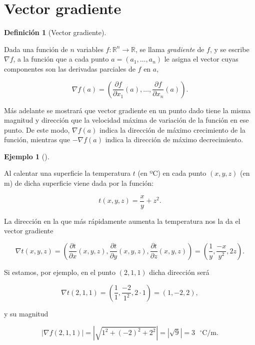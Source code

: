 \documentclass[
  a4paper,
]{scrreport}
\theoremstyle{definition}
\newtheorem{definition}{Definición}[chapter]
\theoremstyle{plain}
\theoremstyle{plain}
\theoremstyle{definition}
\theoremstyle{definition}
\newtheorem{example}{Ejemplo}[chapter]
\theoremstyle{plain}
\theoremstyle{remark}
\begin{document}
\hypertarget{vector-gradiente}{%
\section{Vector gradiente}\label{vector-gradiente}}

\begin{definition}[Vector
gradiente]\protect\hypertarget{def-vector-gradiente}{}\label{def-vector-gradiente}

Dada una función de \(n\) variables
\(f:\mathbb{R}^n\rightarrow \mathbb{R}\), se llama \emph{gradiente} de
\(f\), y se escribe \(\nabla f\), a la función que a cada punto
\(a=(a_1,\ldots,a_n)\) le asigna el vector cuyas componentes son las
derivadas parciales de \(f\) en \(a\),

\[\nabla f(a)=\left(\frac{\partial f}{\partial x_1}(a),\ldots,\frac{\partial f}{\partial x_n}(a)\right).\]

\end{definition}

Más adelante se mostrará que vector gradiente en un punto dado tiene la
misma magnitud y dirección que la velocidad máxima de variación de la
función en ese punto. De este modo, \(\nabla f(a)\) indica la dirección
de máximo crecimiento de la función, mientras que \(-\nabla f(a)\)
indica la dirección de máximo decrecimiento.

\begin{example}[]\protect\hypertarget{exm-vector-gradiente}{}\label{exm-vector-gradiente}

Al calentar una superficie la temperatura \(t\) (en ºC) en cada punto
\((x,y,z)\) (en m) de dicha superficie viene dada por la función:

\[
t(x,y,z)=\frac{x}{y}+z^2.
\]

La dirección en la que más rápidamente aumenta la temperatura nos la da
el vector gradiente

\[
\nabla t(x,y,z)=\left(\frac{\partial t}{\partial x}(x,y,z),\frac{\partial t}{\partial y}(x,y,z),\frac{\partial t}{\partial
z}(x,y,z)\right)=\left(\frac{1}{y},\frac{-x}{y^2},2z\right).
\]

Si estamos, por ejemplo, en el punto \((2,1,1)\) dicha dirección será

\[
\nabla t(2,1,1)=\left(\frac{1}{1},\frac{-2}{1^2},2\cdot 1\right)=(1,-2,2),
\]

y su magnitud

\[
|\nabla f(2,1,1)|=|\sqrt{1^2+(-2)^2+2^2}|=|\sqrt{9}|=3 \mbox{ $^\circ$C/m}.
\]

\end{example}
\end{document}
